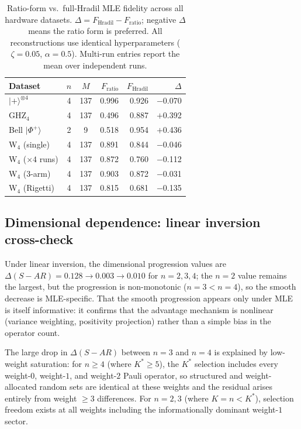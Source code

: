 \documentclass[twocolumn,prx,aps,superscriptaddress,longbibliography]{revtex4-2}
\begin{document}
\begin{table}[h]
\caption{Ratio-form vs.\ full-Hradil MLE fidelity across all
hardware datasets.  $\Delta = F_{\mathrm{Hradil}} - F_{\mathrm{ratio}}$;
negative $\Delta$ means the ratio form is preferred.
All reconstructions use identical hyperparameters
($\zeta = 0.05$, $\alpha = 0.5$).
Multi-run entries report the mean over independent runs.}
\label{tab:mle-comparison}
\begin{ruledtabular}
\begin{tabular}{lccrrr}
Dataset & $n$ & $M$ & $F_{\mathrm{ratio}}$ & $F_{\mathrm{Hradil}}$ & $\Delta$ \\
\midrule
$|{+}\rangle^{\otimes 4}$ & 4 & 137 & 0.996 & 0.926 & $-$0.070 \\
GHZ$_4$                    & 4 & 137 & 0.496 & 0.887 & $+$0.392 \\
Bell $|\Phi^+\rangle$      & 2 & 9   & 0.518 & 0.954 & $+$0.436 \\
W$_4$ (single)             & 4 & 137 & 0.891 & 0.844 & $-$0.046 \\
W$_4$ ($\times 4$ runs)    & 4 & 137 & 0.872 & 0.760 & $-$0.112 \\
W$_4$ (3-arm)              & 4 & 137 & 0.903 & 0.872 & $-$0.031 \\
W$_4$ (Rigetti)            & 4 & 137 & 0.815 & 0.681 & $-$0.135 \\
\end{tabular}
\end{ruledtabular}
\end{table}

\subsection{Dimensional dependence: linear inversion cross-check}
\label{sec:lininv-crosscheck}

Under linear inversion, the dimensional progression values are
$\Delta(S{-}AR) = 0.128 \to 0.003 \to 0.010$ for
$n = 2, 3, 4$; the $n = 2$ value remains the largest, but the
progression is non-monotonic ($n{=}3 < n{=}4$), so the smooth
decrease is MLE-specific.  That the smooth progression appears only
under MLE is itself informative: it confirms that the advantage
mechanism is nonlinear (variance weighting, positivity projection)
rather than a simple bias in the operator count.

The large drop in $\Delta(S{-}AR)$ between $n = 3$ and $n = 4$ is
explained by low-weight saturation: for $n \geq 4$ (where $K^* \geq 5$),
the $K^*$ selection includes every weight-$0$, weight-$1$, and
weight-$2$ Pauli operator, so structured and weight-allocated random
sets are identical at these weights and the residual arises entirely
from weight $\geq 3$ differences.  For $n = 2, 3$ (where $K = n < K^*$),
selection freedom exists at all weights including the informationally
dominant weight-$1$ sector.
\end{document}
